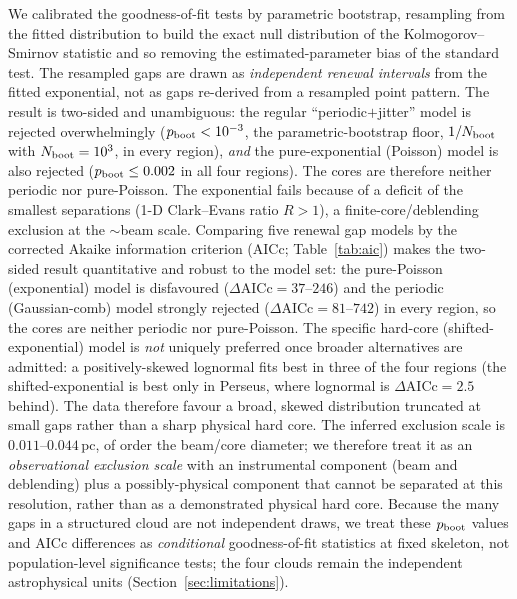 \documentclass[usenatbib,twoside,twocolumn]{mnras}
\begin{document}
We calibrated the goodness-of-fit tests by parametric bootstrap, resampling from the fitted distribution to build the exact null distribution of the Kolmogorov--Smirnov statistic and so removing the estimated-parameter bias of the standard test. The resampled gaps are drawn as \emph{independent renewal intervals} from the fitted exponential, not as gaps re-derived from a resampled point pattern. The result is two-sided and unambiguous: the regular ``periodic$+$jitter'' model is rejected overwhelmingly ($p_{\rm boot}<10^{-3}$, the parametric-bootstrap floor, $1/N_{\rm boot}$ with $N_{\rm boot}=10^3$, in every region), \emph{and} the pure-exponential (Poisson) model is also rejected ($p_{\rm boot}\leq0.002$ in all four regions). The cores are therefore neither periodic nor pure-Poisson. The exponential fails because of a deficit of the smallest separations (1-D Clark--Evans ratio $R>1$), a finite-core/deblending exclusion at the $\sim$beam scale. Comparing five renewal gap models by the corrected Akaike information criterion (AICc; Table~\ref{tab:aic}) makes the two-sided result quantitative and robust to the model set: the pure-Poisson (exponential) model is disfavoured ($\Delta$AICc$=37$--$246$) and the periodic (Gaussian-comb) model strongly rejected ($\Delta$AICc$=81$--$742$) in every region, so the cores are neither periodic nor pure-Poisson. The specific hard-core (shifted-exponential) model is \emph{not} uniquely preferred once broader alternatives are admitted: a positively-skewed lognormal fits best in three of the four regions (the shifted-exponential is best only in Perseus, where lognormal is $\Delta$AICc$=2.5$ behind). The data therefore favour a broad, skewed distribution truncated at small gaps rather than a sharp physical hard core. The inferred exclusion scale is $0.011$--$0.044$\,pc, of order the beam/core diameter; we therefore treat it as an \emph{observational exclusion scale} with an instrumental component (beam and deblending) plus a possibly-physical component that cannot be separated at this resolution, rather than as a demonstrated physical hard core. Because the many gaps in a structured cloud are not independent draws, we treat these $p_{\rm boot}$ values and AICc differences as \emph{conditional} goodness-of-fit statistics at fixed skeleton, not population-level significance tests; the four clouds remain the independent astrophysical units (Section~\ref{sec:limitations}).
\end{document}
